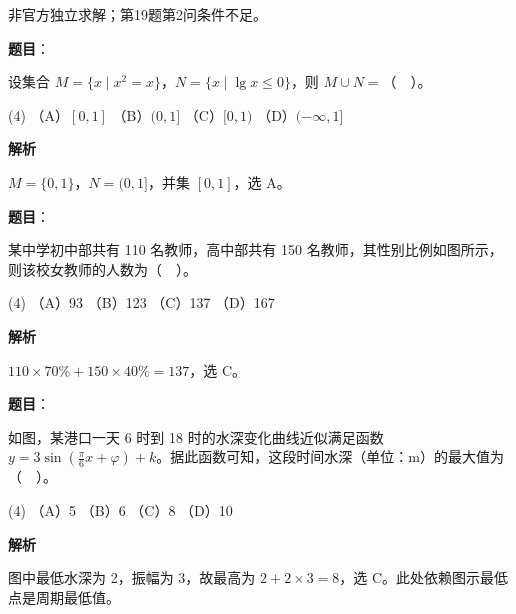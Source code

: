 

非官方独立求解；第19题第2问条件不足。

\begin{answer}

\textbf{题目}：

设集合 $M=\{x\mid x^2=x\}$，$N=\{x\mid\lg x\leq0\}$，则 $M\cup N=$（　）。

\begin{gkopts}(4)
\task （A）$[0,1]$
\task （B）$(0,1]$
\task （C）$[0,1)$
\task （D）$(-\infty,1]$
\end{gkopts}

\textbf{解析}

$M=\{0,1\}$，$N=(0,1]$，并集 $[0,1]$，选 A。


\end{answer}
\begin{answer}

\textbf{题目}：

某中学初中部共有 110 名教师，高中部共有 150 名教师，其性别比例如图所示，则该校女教师的人数为（　）。
\nopagebreak[4]
\begin{center}\end{center}
\nopagebreak[4]
\begin{gkopts}(4)
\task （A）93
\task （B）123
\task （C）137
\task （D）167
\end{gkopts}

\textbf{解析}

$110\times70\%+150\times40\%=137$，选 C。


\end{answer}
\begin{answer}

\textbf{题目}：

如图，某港口一天 6 时到 18 时的水深变化曲线近似满足函数 $y=3\sin(\frac\pi6x+\varphi)+k$。据此函数可知，这段时间水深（单位：m）的最大值为（　）。
\nopagebreak[4]
\begin{center}\end{center}
\nopagebreak[4]
\begin{gkopts}(4)
\task （A）5
\task （B）6
\task （C）8
\task （D）10
\end{gkopts}

\textbf{解析}

图中最低水深为 2，振幅为 3，故最高为 $2+2\times3=8$，选 C。此处依赖图示最低点是周期最低值。


\end{answer}
